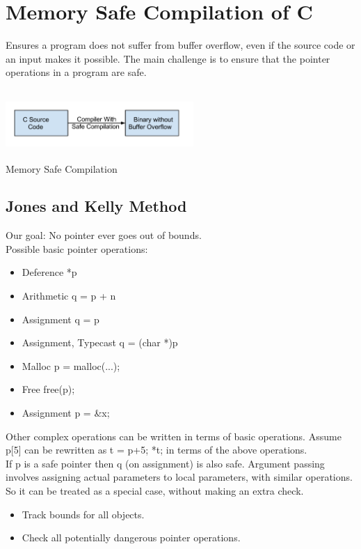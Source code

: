 \documentclass[11pt]{article} %
\begin{document}
\section {Memory Safe Compilation of C}
Ensures a program does not suffer from buffer overflow, even if the
source code or an input makes it possible. The main challenge is to ensure that
the pointer operations in a program are safe.

\begin {center}
\includegraphics [width=270px,height=100px] {img/img4.png} \\
\caption {Memory Safe Compilation}
\end {center}

\subsection {Jones and Kelly Method}
Our goal: No pointer ever goes out of bounds.\\
Possible basic pointer operations:
\begin {itemize}\itemsep -2pt
\item Deference *p
\item Arithmetic q = p + n
\item Assignment q = p
\item Assignment, Typecast q = (char *)p
\item Malloc p = malloc(...);
\item Free free(p);
\item Assignment p = \&x;
\end {itemize}
Other complex operations can be written in terms of basic operations. Assume p[5]
can be rewritten as t = p+5; *t; in terms of the above operations.\\

If p is a safe pointer then q (on assignment) is also safe. Argument passing 
involves assigning actual parameters to local parameters, with similar operations.
So it can be treated as a special case, without making an extra check.

\begin{itemize} \itemsep -2pt
\item Track bounds for all objects.
\item Check all potentially dangerous pointer operations.
\end{itemize}
\end{document}
